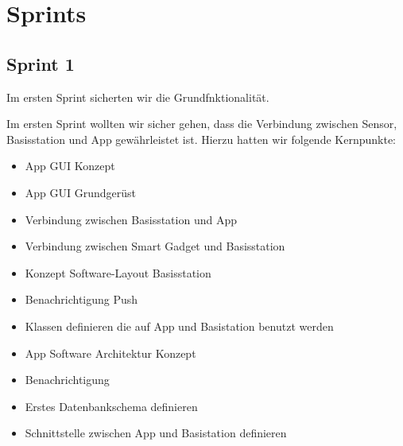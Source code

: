 \section{Sprints}


	\subsection{Sprint 1}
	Im ersten Sprint sicherten wir die Grundfnktionalität. 

			Im ersten Sprint wollten wir sicher gehen, dass die Verbindung zwischen Sensor, Basisstation und App gewährleistet ist. Hierzu hatten wir folgende Kernpunkte:
			\begin{itemize}
				\item App GUI Konzept 
				\item App GUI Grundgerüst
				\item Verbindung zwischen Basisstation und App
				\item Verbindung zwischen Smart Gadget und Basisstation
				\item Konzept Software-Layout Basisstation
				\item Benachrichtigung Push
				\item Klassen definieren die auf App und Basistation benutzt werden
				\item App Software Architektur Konzept
				\item Benachrichtigung
				\item Erstes Datenbankschema definieren
				\item Schnittstelle zwischen App und Basistation definieren
			\end{itemize}

